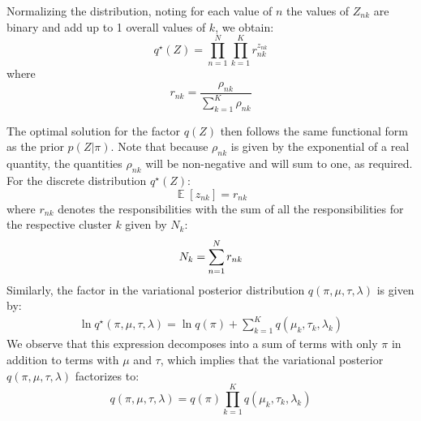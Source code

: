 \documentclass[conference]{IEEEtran}
\begin{document}
Normalizing the distribution, noting for each value of $n$ the values of $Z_{nk}$ are binary and add up to 1 overall values of $k$, we obtain:
\begin{equation}
    q^\star(Z) = \prod_{n=1}^{N}\prod_{k=1}^{K} r_{nk}^{z_{nk}}
\end{equation}
where
\begin{equation}\label{rnk}
    r_{nk} = \frac{\rho_{nk}}{\sum_{k=1}^{K}\rho_{nk}}
\end{equation}

The optimal solution for the factor $q(Z)$ then follows the same functional form
as the prior $p(Z|\pi)$. Note that because $\rho_{nk}$ is given by the exponential of a real
quantity, the quantities $\rho_{nk}$ will be non-negative and will sum to one, as required.
For the discrete distribution $q^\star(Z)$:
\begin{equation}
    \mathop{\mathbb{E}}[z_{nk}] = r_{nk}
\end{equation}
where $r_{nk}$ denotes the responsibilities with the sum of all the responsibilities for the respective cluster $k$ given by $N_k$:
\begin{equation}
    N_k = \sum_{\mathclap{n=1}}^{N}r_{nk}
\end{equation}
Similarly, the factor  in the variational posterior distribution $q(\pi, \mu, \tau, \lambda) $ is given by:
\begin{equation}
    \begin{split}
        \ln q^\star (\pi, \mu, \tau, \lambda) = \ln q(\pi) +  \sum_{k=1}^{K} q(\mu_k, \tau_k, \lambda_k)
    \end{split}
\end{equation}
We observe that this expression decomposes into a sum of
terms with only $\pi$ in addition to terms with $\mu$ and $\tau$, which implies
that the variational posterior $q(\pi, \mu, \tau, \lambda)$ factorizes to:\\
\begin{equation}
    q(\pi, \mu, \tau, \lambda) = q(\pi) \prod_{k=1}^{K} q(\mu_k, \tau_k, \lambda_k)
\end{equation}

\end{document}
